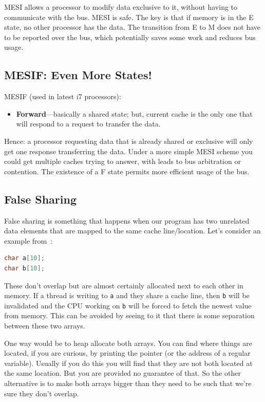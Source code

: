 \documentclass[a4paper]{report}
\begin{document}
    MESI allows a processor to modify data exclusive to it, without
    having to communicate with the bus.  MESI is safe. The key is that
    if memory is in the E state, no other processor has the data. The transition from E to M does not have to be reported over the bus, which potentially saves some work and reduces bus usage. 

\subsection*{MESIF: Even More States!}

    MESIF (used in latest i7 processors):
      \begin{itemize}
        \item {\bf Forward}---basically a shared state; but, current
          cache is the only one that will respond to a request to
          transfer the data.
      \end{itemize}

    Hence: a processor requesting data that is already shared or exclusive will
      only get one response transferring the data. Under a more simple MESI scheme you could get multiple caches trying to answer, with leads to bus arbitration or contention. The existence of a F state permits more efficient usage of the bus.
      
      
\subsection*{False Sharing}
False sharing is something that happens when our program has two unrelated data elements that are mapped to the same cache line/location. Let's consider an example from~\cite{falsesharing}:

\begin{lstlisting}[language=C]
char a[10];
char b[10];
\end{lstlisting}
These don't overlap but are almost certainly allocated next to each other in memory. If a thread is writing to \texttt{a} and they share a cache line, then \texttt{b} will be invalidated and the CPU working on \texttt{b} will be forced to fetch the newest value from memory. This can be avoided by seeing to it that there is some separation between these two arrays.

One way would be to heap allocate both arrays. You can find where things are located, if you are curious, by printing the pointer (or the address of a regular variable). Usually if you do this you will find that they are not both located at the same location. But you are provided no guarantee of that. So the other alternative is to make both arrays bigger than they need to be such that we're sure they don't overlap.
\end{document}
